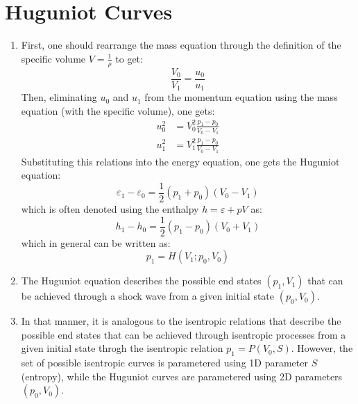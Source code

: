 ﻿\documentclass[11pt]{article}
\begin{document}
\section{Huguniot Curves}
\begin{enumerate}
  \subsection{The derivation of the Huguniot Curve}
  \item First, one should rearrange the mass equation through the definition of the specific volume $V = \frac{1}{\rho}$ to get:
  \begin{equation}
    \frac{V_0}{V_1} = \frac{u_0}{u_1}
  \end{equation}
  Then, eliminating $u_0$ and $u_1$ from the momentum equation using the mass equation (with the specific volume), one gets:
  \begin{align}
    u_0^2 &= V_0^2 \frac{p_1 - p_0}{V_0 - V_1} \\
    u_1^2 &= V_1^2 \frac{p_1 - p_0}{V_0 - V_1} \label{u_shock}
  \end{align}
  Substituting this relations into the energy equation, one gets the Huguniot equation:
  \begin{equation}
    \varepsilon_1 - \varepsilon_0 = \frac{1}{2}(p_1 + p_0) (V_0 - V_1) \label{Hugoniot Energy}
  \end{equation}
  which is often denoted using the enthalpy $h = \varepsilon + pV$ as:
  \begin{equation}
    h_1 - h_0 = \frac{1}{2} (p_1 - p_0)(V_0 + V_1) \label{Hugoniot}
  \end{equation}
  which in general can be written as:
  \begin{equation}
    p_1 = H(V_1; p_0, V_0)
  \end{equation}
  \item The Huguniot equation describes the possible end states $(p_1, V_1)$ that can be achieved through a shock wave from a given initial state $(p_0, V_0)$.
  \item In that manner, it is analogous to the isentropic relations that describe the possible end states that can be achieved through isentropic processes from a given initial state throgh the isentropic relation $p_1=P(V_0,S)$. However, the set of possible isentropic curves is parametered using 1D parameter $S$ (entropy), while the Huguniot curves are parametered using 2D parameters $(p_0, V_0)$.
\end{enumerate}
\end{document}
